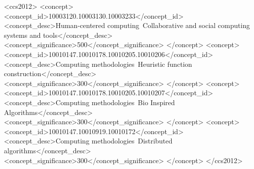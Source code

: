 \documentclass[sigconf]{acmart}
\begin{document}
%
%
\begin{CCSXML}
<ccs2012>
<concept>
<concept_id>10003120.10003130.10003233</concept_id>
<concept_desc>Human-centered computing~Collaborative and social computing systems and tools</concept_desc>
<concept_significance>500</concept_significance>
</concept>
<concept>
<concept_id>10010147.10010178.10010205.10010206</concept_id>
<concept_desc>Computing methodologies~Heuristic function construction</concept_desc>
<concept_significance>300</concept_significance>
</concept>
<concept>
<concept_id>10010147.10010178.10010205.10010207</concept_id>
<concept_desc>Computing methodologies~Bio Inspired Algorithms</concept_desc>
<concept_significance>300</concept_significance>
</concept>
<concept>
<concept_id>10010147.10010919.10010172</concept_id>
<concept_desc>Computing methodologies~Distributed algorithms</concept_desc>
<concept_significance>300</concept_significance>
</concept>
</ccs2012>
\end{CCSXML}




\maketitle




 
\end{document}
